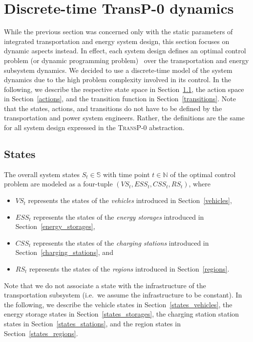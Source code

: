 \section{Discrete-time \textbf{TransP-0} dynamics}
\label{dynamics}

While the previous section was concerned only with the static parameters of integrated transportation and energy system design, this section focuses on dynamic aspects instead. In effect, each system design defines an optimal control problem (or dynamic programming problem)~\cite{Bertsekas1995} over the transportation and energy subsystem dynamics. We decided to use a discrete-time model of the system dynamics due to the high problem complexity involved in its control. In the following, we describe the respective state space in Section~\ref{states}, the action space in Section~\ref{actions}, and the transition function in Section~\ref{transitions}. Note that the states, actions, and transitions do not have to be defined by the transportation and power system engineers. Rather, the definitions are the same for all system design expressed in the \textsc{TransP-0} abstraction.

\subsection{States}
\label{states}

The overall system states $S_t \in \mathbb{S}$ with time point $t \in \mathbb{N}$ of the optimal control problem are modeled as a four-tuple $(VS_t, ESS_t, CSS_t, RS_t)$, where
\begin{itemize}
	\item $VS_t$ represents the states of the \textit{vehicles} introduced in Section~\ref{vehicles},
	\item $ESS_t$ represents the states of the \textit{energy storages} introduced in Section~\ref{energy_storages},
	\item $CSS_t$ represents the states of the \textit{charging stations} introduced in Section~\ref{charging_stations}, and
	\item $RS_t$ represents the states of the \textit{regions} introduced in Section~\ref{regions}.
\end{itemize}
Note that we do not associate a state with the infrastructure of the transportation subsystem (i.e.\ we assume the infrastructure to be constant). In the following, we describe the vehicle states in Section~\ref{states_vehicles}, the energy storage states in Section~\ref{states_storages}, the charging station station states in Section~\ref{states_stations}, and the region states in Section~\ref{states_regions}.

